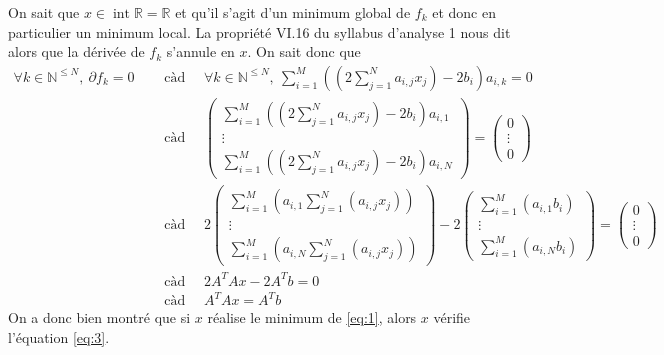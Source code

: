 \documentclass[a4paper, 10pt]{article}
\newcommand{\IR}{\mathbb{R}}
\newcommand{\IN}{\mathbb{N}}
\newcommand{\inte}{\operatorname{int}}
\begin{document}
\noindent
On sait que \( x \in \inte \IR = \IR \) et qu'il s'agit d'un minimum global de \( f_k \) et donc en particulier un minimum local. La propriété VI.16 du syllabus d'analyse 1 nous dit alors que la dérivée de \( f_k \) s'annule en \( x \). On sait donc que
\begin{align*}
    \forall k \in \IN^{\leq N},~ \partial f_k = 0
    & \quad \text{ càd } \quad \forall k \in \IN^{\leq N},~ \sum_{i = 1}^M \left( \left( 2 \sum_{j = 1}^N a_{i, j} x_j \right) - 2 b_i \right) a_{i, k} = 0 \\
    & \quad \text{ càd } \quad
        \begin{pmatrix}
        \displaystyle \sum_{i = 1}^M \left( \left( 2 \sum_{j = 1}^N a_{i, j} x_j \right) - 2 b_i \right) a_{i, 1} \\
        \vdots \\
        \displaystyle \sum_{i = 1}^M \left( \left( 2 \sum_{j = 1}^N a_{i, j} x_j \right) - 2 b_i \right) a_{i, N}
        \end{pmatrix}
        =
        \begin{pmatrix}
        0 \\
        \vdots \\
        0
        \end{pmatrix} \\
    & \quad \text{ càd } \quad
        2 \begin{pmatrix}
        \displaystyle \sum_{i = 1}^M \left( a_{i, 1} \sum_{j = 1}^N \left( a_{i, j} x_j \right) \right) \\
        \vdots \\
        \displaystyle \sum_{i = 1}^M \left( a_{i, N} \sum_{j = 1}^N \left( a_{i, j} x_j \right) \right)
        \end{pmatrix}
        -
        2 \begin{pmatrix}
        \displaystyle \sum_{i = 1}^M \left( a_{i, 1} b_i \right) \\
        \vdots \\
        \displaystyle \sum_{i = 1}^M \left( a_{i, N} b_i \right)
        \end{pmatrix}
        =
        \begin{pmatrix}
        0 \\
        \vdots \\
        0
        \end{pmatrix} \\
    & \quad \text{ càd } \quad 2 A^T A x - 2 A^T b = 0 \\
    & \quad \text{ càd } \quad A^T A x = A^T b
\end{align*}
On a donc bien montré que si \( x \) réalise le minimum de \eqref{eq:1}, alors \( x \) vérifie l'équation \eqref{eq:3}.
\end{document}
